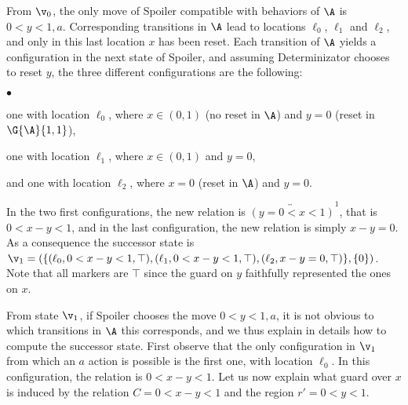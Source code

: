 \documentclass{LMCS}
\theoremstyle{plain}\newtheorem{proposition}[thm]{Proposition}
\begin{document}
\begin{exa}
From $\v_0$, the only move of Spoiler compatible with behaviors of
$\A$ is $0<y<1,a$.
Corresponding transitions in $\A$  lead to
locations $\ell_0$, $\ell_1$ and $\ell_2$, and only in this last
location $x$ has been reset.  Each transition of $\A$ yields a
configuration in the next state of Spoiler, and assuming
Determinizator chooses to reset $y$, the three different
configurations are the following:
 \begin{iteMize}{$\bullet$}
 \item one with location $\ell_0$, where $x\in(0,1)$ (no reset in $\A$) and $y=0$ (reset in $\G{\A}{1,1}$),
 \item one with location $\ell_1$, where $x\in(0,1)$ and $y=0$,
 \item and one with location $\ell_2$, where $x=0$ (reset in $\A$) and
   $y=0$.
 \end{iteMize} 
 In the two first configurations, the new relation is
 $\overleftrightarrow{(y=0<x<1)}^1$, that is $0 <x-y <1$, and in the
 last configuration, the new relation is simply $x -y =0$. As a
 consequence the successor state is $\v_1 = (\{(\ell_0,0<x-y<1,\top),
 (\ell_1,0<x-y<1,\top), (\ell_2,x-y=0,\top)\} ,\{0\})$. Note that all
 markers are $\top$ since the guard on $y$ faithfully represented the
 ones on $x$. 

 From state $\v_1$, if Spoiler chooses the move $0<y<1, a$, it is not
 obvious to which transitions in $\A$ this corresponds, and we thus
 explain in details how to compute the successor state. 
First observe that the only configuration in $\v_1$ from which an $a$
 action is possible is the first one, with location $\ell_0$. In this
 configuration, the relation is $0<x-y<1$.  Let us now explain what
 guard over $x$ is induced by the relation $C = 0<x-y<1$ and the region
 $r' = 0<y<1$.
\begin{figure}[htbp]
\begin{center}
\end{center}
\end{figure}
\end{exa}
\end{document}

